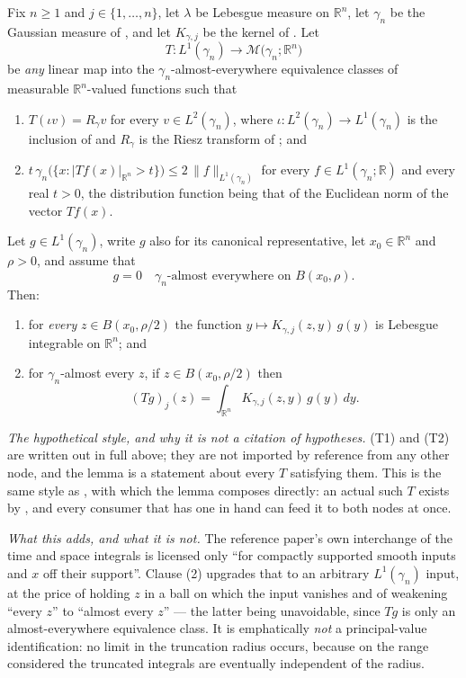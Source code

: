 \begin{lemma}
Fix $n \geq 1$ and $j \in \{1,\ldots,n\}$, let $\lambda$ be Lebesgue measure on
$\mathbb{R}^n$, let $\gamma_n$ be the Gaussian measure of
, and let $K_{\gamma,j}$ be the kernel of
.  Let
\[
  T : L^1(\gamma_n) \longrightarrow
      \mathcal{M}\bigl(\gamma_n;\mathbb{R}^n\bigr)
\]
be \emph{any} linear map into the $\gamma_n$-almost-everywhere equivalence
classes of measurable $\mathbb{R}^n$-valued functions such that
\begin{enumerate}
\item[(T1)] $T(\iota v) = R_\gamma v$ for every $v \in L^2(\gamma_n)$, where
$\iota : L^2(\gamma_n) \to L^1(\gamma_n)$ is the inclusion of
 and $R_\gamma$ is the Riesz transform of
; and
\item[(T2)] $t\,\gamma_n\bigl(\{x : |Tf(x)|_{\mathbb{R}^n} > t\}\bigr)
\leq 2\,\|f\|_{L^1(\gamma_n)}$ for every $f \in L^1(\gamma_n;\mathbb{R})$ and
every real $t > 0$, the distribution function being that of the Euclidean norm
of the vector $Tf(x)$.
\end{enumerate}
Let $g \in L^1(\gamma_n)$, write $g$ also for its canonical representative, let
$x_0 \in \mathbb{R}^n$ and $\rho > 0$, and assume that
\[
  g = 0 \quad \gamma_n\text{-almost everywhere on } B(x_0,\rho) .
\]
Then:
\begin{enumerate}
\item for \emph{every} $z \in B(x_0,\rho/2)$ the function
$y \mapsto K_{\gamma,j}(z,y)\,g(y)$ is Lebesgue integrable on $\mathbb{R}^n$;
and
\item for $\gamma_n$-almost every $z$, if $z \in B(x_0,\rho/2)$ then
\[
  (Tg)_j(z) = \int_{\mathbb{R}^n}K_{\gamma,j}(z,y)\,g(y)\,dy .
\]
\end{enumerate}

\emph{The hypothetical style, and why it is not a citation of hypotheses.}
(T1) and (T2) are written out in full above; they are not imported by reference
from any other node, and the lemma is a statement about every $T$ satisfying
them.  This is the same style as , with which
the lemma composes directly: an actual such $T$ exists by
, and every consumer that has one in hand can feed it to
both nodes at once.

\emph{What this adds, and what it is not.}  The reference paper's own
interchange of the time and space integrals is licensed only ``for compactly
supported smooth inputs and $x$ off their support''.  Clause (2) upgrades that
to an arbitrary $L^1(\gamma_n)$ input, at the price of holding $z$ in a ball on
which the input vanishes and of weakening ``every $z$'' to ``almost every
$z$'' --- the latter being unavoidable, since $Tg$ is only an almost-everywhere
equivalence class.  It is emphatically \emph{not} a principal-value
identification: no limit in the truncation radius occurs, because on the range
considered the truncated integrals are eventually independent of the radius.


\end{lemma}
